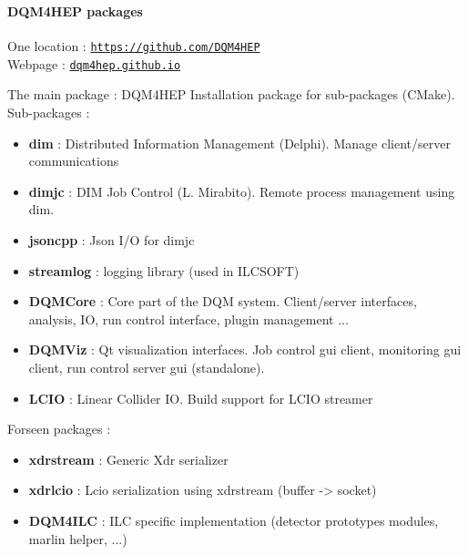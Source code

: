 \documentclass[8pt]{beamer}
\begin{document}
  
  \begin{frame}
    \frametitle{\secname}
    \framesubtitle{DQM4HEP packages}
    
    One location : \href{https://github.com/DQM4HEP}{\tt https://github.com/DQM4HEP} \\
    Webpage : \href{dqm4hep.github.io}{\tt dqm4hep.github.io} \\
    \begin{block}{The main package : DQM4HEP}
      Installation package for sub-packages (CMake). \\
      Sub-packages :
      \begin{itemize}
        \item \textbf{dim} : Distributed Information Management (Delphi). Manage client/server communications
        \item \textbf{dimjc} : DIM Job Control (L. Mirabito). Remote process management using dim.
        \item \textbf{jsoncpp} : Json I/O for dimjc
        \item \textbf{streamlog} : logging library (used in ILCSOFT)
        \item \textbf{DQMCore} : Core part of the DQM system. Client/server interfaces, analysis, IO, run control interface, plugin management ...
        \item \textbf{DQMViz} : Qt visualization interfaces. Job control gui client, monitoring gui client, run control server gui (standalone).
        \item \textbf{LCIO} : Linear Collider IO. Build support for LCIO streamer
      \end{itemize}
      Forseen packages :
      \begin{itemize}
        \item \textbf{xdrstream} : Generic Xdr serializer
        \item \textbf{xdrlcio} : Lcio serialization using xdrstream (buffer -> socket)
        \item \textbf{DQM4ILC} : ILC specific implementation (detector prototypes modules, marlin helper, ...)
      \end{itemize}
    \end{block}

  \end{frame}
  
\end{document}

